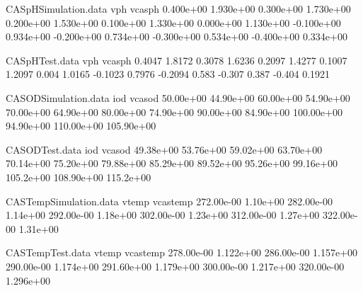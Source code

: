 
\begin{filecontents}{CASpHSimulation.data}
vph	vcasph
0.400e+00	1.930e+00
0.300e+00	1.730e+00
0.200e+00	1.530e+00
0.100e+00	1.330e+00
0.000e+00	1.130e+00
-0.100e+00	0.934e+00
-0.200e+00	0.734e+00
-0.300e+00	0.534e+00
-0.400e+00	0.334e+00
\end{filecontents}

\begin{filecontents}{CASpHTest.data}
vph	vcasph
0.4047	1.8172
0.3078	1.6236
0.2097	1.4277
0.1007	1.2097
0.004	1.0165
-0.1023	0.7976
-0.2094	0.583
-0.307	0.387
-0.404	0.1921
\end{filecontents}

\begin{filecontents}{CASODSimulation.data}
iod	vcasod
50.00e+00	44.90e+00
60.00e+00	54.90e+00
70.00e+00	64.90e+00
80.00e+00	74.90e+00
90.00e+00	84.90e+00
100.00e+00	94.90e+00
110.00e+00	105.90e+00
\end{filecontents}

\begin{filecontents}{CASODTest.data}
iod	vcasod
49.38e+00	53.76e+00
59.02e+00	63.70e+00
70.14e+00	75.20e+00
79.88e+00	85.29e+00
89.52e+00	95.26e+00
99.16e+00	105.2e+00
108.90e+00	115.2e+00
\end{filecontents}

\begin{filecontents}{CASTempSimulation.data}
vtemp	vcastemp
272.00e-00	1.10e+00
282.00e-00	1.14e+00
292.00e-00	1.18e+00
302.00e-00	1.23e+00
312.00e-00	1.27e+00
322.00e-00	1.31e+00
\end{filecontents}

\begin{filecontents}{CASTempTest.data}
vtemp	vcastemp
278.00e-00	1.122e+00
286.00e-00	1.157e+00
290.00e-00	1.174e+00
291.60e+00	1.179e+00
300.00e-00	1.217e+00
320.00e-00	1.296e+00
\end{filecontents}
